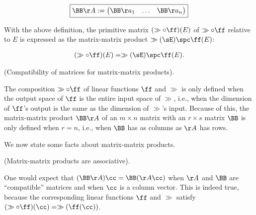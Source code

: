 \begin{defn}
    \begin{align*}
        \boxed
        {
            \BB \AA := \begin{pmatrix} \BB \aa_1 & \hdots & \BB \aa_n \end{pmatrix}
        }
    \end{align*}
    
    With the above definition, the primitive matrix $(\gg \circ \ff)(E)$ of $\gg \circ \ff$ relative to $E$ is expressed as the matrix-matrix product $\gg(\sE) \spc \ff(E)$:
    
    \begin{align*}
        (\gg \circ \ff)(E) = \gg(\sE) \spc \ff(E).
    \end{align*}
\end{defn}

\begin{remark}
    (Compatibility of matrices for matrix-matrix products). 
    
    The composition $\gg \circ \ff$ of linear functions $\ff$ and $\gg$ is only defined when the output space of $\ff$ is the entire input space of $\gg$, i.e., when the dimension of $\ff$'s output is the same as the dimension of $\gg$'s input. Because of this, the matrix-matrix product $\BB \AA$ of an $m \times n$ matrix with an $r \times s$ matrix $\BB$ is only defined when $r = n$, i.e., when $\BB$ has as columns as $\AA$ has rows.
\end{remark}

We now state some facts about matrix-matrix products.

\begin{remark}
    (Matrix-matrix products are associative).
    
    One would expect that $(\BB \AA) \cc = \BB (\AA \cc)$ when $\AA$ and $\BB$ are ``compatible'' matrices and when $\cc$ is a column vector. This is indeed true, because the corresponding linear functions $\ff$ and $\gg$ satisfy $(\gg \circ \ff)(\cc) = \gg(\ff(\cc))$.
\end{remark}

